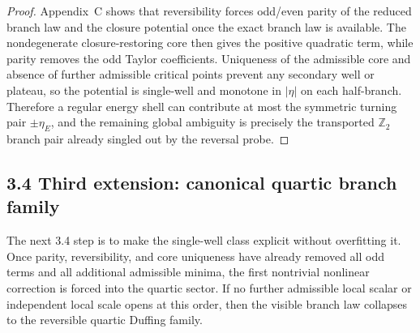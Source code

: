 \documentclass[12pt,a4paper]{article}
\begin{document}
\begin{proof}
Appendix~C shows that reversibility forces odd/even parity of the reduced branch law and the closure potential once the exact branch law is available. The nondegenerate closure-restoring core then gives the positive quadratic term, while parity removes the odd Taylor coefficients. Uniqueness of the admissible core and absence of further admissible critical points prevent any secondary well or plateau, so the potential is single-well and monotone in $|\eta|$ on each half-branch. Therefore a regular energy shell can contribute at most the symmetric turning pair $\pm\eta_E$, and the remaining global ambiguity is precisely the transported $\mathbb Z_2$ branch pair already singled out by the reversal probe.
\end{proof}

\subsection*{3.4 Third extension: canonical quartic branch family}
The next 3.4 step is to make the single-well class explicit without overfitting it. Once parity, reversibility, and core uniqueness have already removed all odd terms and all additional admissible minima, the first nontrivial nonlinear correction is forced into the quartic sector. If no further admissible local scalar or independent local scale opens at this order, then the visible branch law collapses to the reversible quartic Duffing family.
\end{document}
